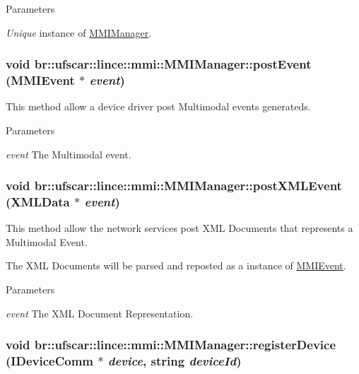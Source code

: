 \begin{DoxyParams}{Parameters}
\item[{\em Unique}]instance of \hyperlink{classbr_1_1ufscar_1_1lince_1_1mmi_1_1MMIManager}{MMIManager}. \end{DoxyParams}
\hypertarget{classbr_1_1ufscar_1_1lince_1_1mmi_1_1MMIManager_a140389a1e17ba07406d79a427039ab1b}{
\subsubsection[{postEvent}]{\setlength{\rightskip}{0pt plus 5cm}void br::ufscar::lince::mmi::MMIManager::postEvent ({\bf MMIEvent} $\ast$ {\em event})}}
\label{classbr_1_1ufscar_1_1lince_1_1mmi_1_1MMIManager_a140389a1e17ba07406d79a427039ab1b}


This method allow a device driver post Multimodal events generateds. 


\begin{DoxyParams}{Parameters}
\item[{\em event}]The Multimodal event. \end{DoxyParams}
\hypertarget{classbr_1_1ufscar_1_1lince_1_1mmi_1_1MMIManager_ac9208d28d50a1f9e727c34f79d7e23f0}{
\subsubsection[{postXMLEvent}]{\setlength{\rightskip}{0pt plus 5cm}void br::ufscar::lince::mmi::MMIManager::postXMLEvent ({\bf XMLData} $\ast$ {\em event})}}
\label{classbr_1_1ufscar_1_1lince_1_1mmi_1_1MMIManager_ac9208d28d50a1f9e727c34f79d7e23f0}


This method allow the network services post XML Documents that represents a Multimodal Event. 

The XML Documents will be parsed and reposted as a instance of \hyperlink{classbr_1_1ufscar_1_1lince_1_1mmi_1_1MMIEvent}{MMIEvent}. 
\begin{DoxyParams}{Parameters}
\item[{\em event}]The XML Document Representation. \end{DoxyParams}
\hypertarget{classbr_1_1ufscar_1_1lince_1_1mmi_1_1MMIManager_a724f0254692c6dddf2adea7e87286bf5}{
\subsubsection[{registerDevice}]{\setlength{\rightskip}{0pt plus 5cm}void br::ufscar::lince::mmi::MMIManager::registerDevice ({\bf IDeviceComm} $\ast$ {\em device}, \/  string {\em deviceId})}}
\label{classbr_1_1ufscar_1_1lince_1_1mmi_1_1MMIManager_a724f0254692c6dddf2adea7e87286bf5}


